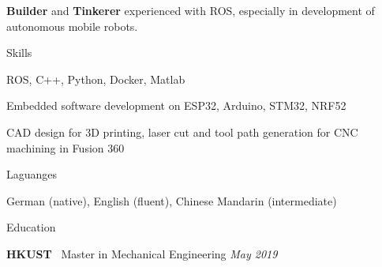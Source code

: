 \documentclass[
	a4paper, %
	11pt, %
]{resume} %
\begin{document}
\textbf{Builder} and \textbf{Tinkerer} experienced with ROS, especially in development of autonomous mobile robots.


\begin{rSection}{Skills}

	\item ROS, C++, Python, Docker, Matlab
	\item Embedded software development on ESP32, Arduino, STM32, NRF52
	\item CAD design for 3D printing, laser cut and tool path generation for CNC machining in Fusion 360

\end{rSection}



\begin{rSection}{Laguanges}
	\item German (native), English (fluent), Chinese Mandarin (intermediate)

\end{rSection}



\begin{rSection}{Education}
	
	\textbf{HKUST} \ Master in Mechanical Engineering \hfill \textit{May 2019}

	
\end{rSection}

\end{document}
